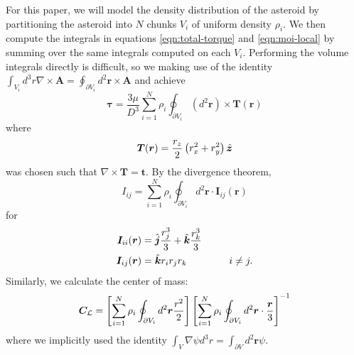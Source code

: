 \documentclass[aps,twocolumn,secnumarabic,balancelastpage,amsmath,amssymb,nofootinbib,floatfix]{revtex4-1}
\begin{document}
For this paper, we will model the density distribution of the asteroid by partitioning the asteroid into $N$ chunks $V_i$ of uniform density $\rho_i$. We then compute the integrals in equations \ref{eqn:total-torque} and \ref{eqn:moi-local} by summing over the same integrals computed on each $V_i$. Performing the volume integrals directly is difficult, so we making use of the identity $\int_{V_i} d^3 r \nabla \times \bm A = \oint_{\partial V_i} d^2 \bm r \times \bm A$
and achieve
\begin{equation}
    \bm \tau = \frac{3\mu}{D^3} \sum_{i=1}^N \rho_i\oint_{\partial V_i} (d^2 \bm r) \times \bm T(\bm r)
    \label{eqn:surface-torque}
\end{equation}
where 
\begin{equation}
    \bm T(\bm r) = \frac{r_z}{2}\left( r_x^2 + r_y^2 \right)\hat{\bm z}
    \label{eqn:torque-generator}
\end{equation}
was chosen such that $\nabla \times \bm T = \bm t$. By the divergence theorem,
\begin{equation}
    I_{ij} = \sum_{i=1}^N \rho_i\oint_{\partial V_i} d^2 \bm r \cdot \bm I_{ij}(\bm r)
    \label{eqn:surface-moi}
\end{equation}
for 
\begin{equation}
\begin{aligned}
    \bm I_{ii}(\bm r)& = \hat{\bm j} \frac{r_j^3}{3} + \hat{\bm k} \frac{r_k^3}{3} \\
    \bm I_{ij}(\bm r)& = \hat{\bm k} r_i r_j r_k \hspace{1.5 cm} i \neq j
    \label{eqn:moi-generator}.
\end{aligned}
\end{equation}
Similarly, we calculate the center of mass:
\begin{equation}
    \bm C_\mathcal{L} = \left[ \sum_{i=1}^N \rho_i \oint_{\partial V_i}d^2 \bm r \frac{r^2}{2} \right]\left[ \sum_{i=1}^N \rho_i \oint_{\partial V_i}d^2 \bm r \cdot \frac{\bm r}{3} \right]^{-1}
    \label{eqn:com-surf}
\end{equation}
where we implicitly used the identity $\int_V \nabla \psi d^3 r = \int_{\partial V} d^2 \bm r \psi$.
\end{document}
